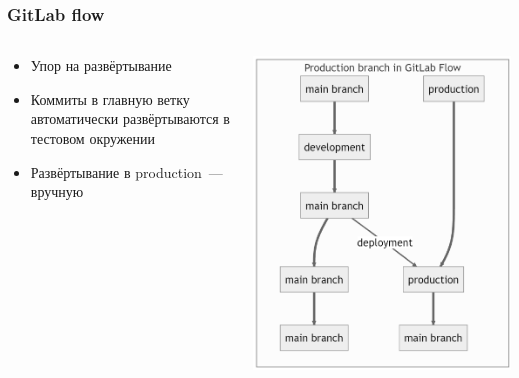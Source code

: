 \documentclass{../../slides-style}
\begin{document}
    \begin{frame}
        \frametitle{GitLab flow}
        \begin{columns}
            \begin{column}{0.6\textwidth}
                \begin{itemize}
                    \item Упор на развёртывание
                    \item Коммиты в главную ветку автоматически развёртываются в тестовом окружении
                    \item Развёртывание в production~--- вручную
                \end{itemize}
            \end{column}
            \begin{column}{0.4\textwidth}
                \begin{center}
                    \includegraphics[height=0.6\textheight]{gitlabFlow.png}
                \end{center}
            \end{column}
        \end{columns}
    \end{frame}
\end{document}
